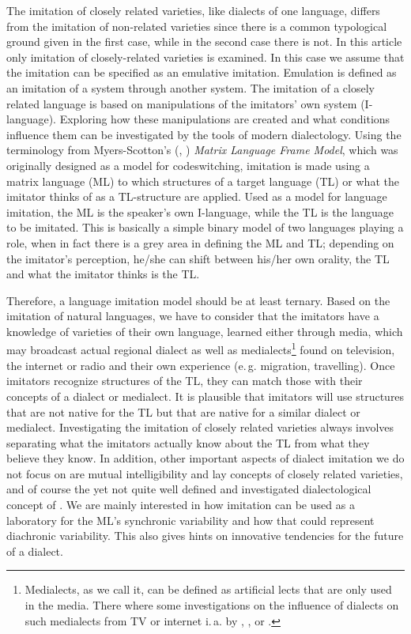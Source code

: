 \documentclass[output=paper]{LSP/langsci}
\begin{document}
The imitation of closely related varieties, like dialects of one language, differs from the imitation of non-related varieties since there is a common typological ground given in the first case, while in the second case there is not. In this article only imitation of closely-related varieties is examined. In this case we assume that the imitation can be specified as an emulative imitation. Emulation is defined as an imitation of a system through another system. The imitation of a closely related language is based on manipulations of the imitators’ own system (I-language). Exploring how these manipulations are created and what conditions influence them can be investigated by the tools of modern dialectology. Using the terminology from Myers-Scotton’s (\citeyear{myers-scotton_duelling_1993}, \citeyear{myers-scotton_contact_2002}) \textit{Matrix Language Frame Model}, which was originally designed as a model for codeswitching, imitation is made using a matrix language (ML) to which structures of a target language (TL) or what the imitator thinks of as a TL-structure are applied. Used as a model for language imitation, the ML is the speaker’s own I-language, while the TL is the language to be imitated. This is basically a simple binary model of two languages playing a role, when in fact there is a grey area in defining the ML and TL; depending on the imitator’s perception, he/she can shift between his/her own orality, the TL and what the imitator thinks is the TL.


Therefore, a language imitation model should be at least ternary. Based on the imitation of natural languages, we have to consider that the imitators have a knowledge of varieties of their own language, learned either through media, which may broadcast actual regional dialect as well as medialects\footnote{Medialects, as we call it, can be defined as artificial lects that are only used in the media. There where some investigations on the influence of dialects on such medialects from TV or internet i.\,a. by \cite{kleiner_medienbairisch_2013}, \cite{androutsopoulos_intermediale_2012}, \cite{riemann_neue_2009} or \cite{mayer_mia_2009}.} found on television, the internet or radio and their own experience (e.\,g. migration, travelling). Once imitators recognize structures of the TL, they can match those with their concepts of a dialect or medialect. It is plausible that imitators will use structures that are not native for the TL but that are native for a similar dialect or medialect. Investigating the imitation of closely related varieties always involves separating what the imitators actually know about the TL from what they believe they know. In addition, other important aspects of dialect imitation we do not focus on are mutual intelligibility and lay concepts of closely related varieties, and of course the yet not quite well defined and investigated dialectological concept of . We are mainly interested in how imitation can be used as a laboratory for the ML's synchronic variability and how that could represent diachronic variability. This also gives hints on innovative tendencies for the future of a dialect. 
\end{document}
